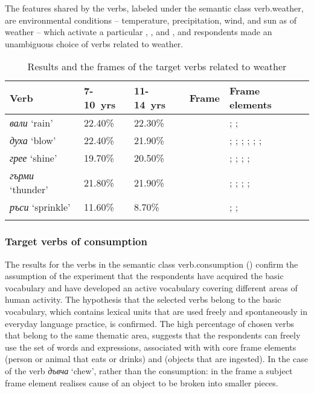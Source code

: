 \documentclass[output=paper,colorlinks,citecolor=brown]{langscibook}
\begin{document}
The features shared by the verbs, labeled under the semantic class verb.wea\-ther, are environmental conditions -- temperature, precipitation, wind, and sun as  of weather --  which activate a particular , , and , and respondents made an unambiguous choice of verbs related to weather. 

\begin{table}
\begin{tabularx}{\textwidth}{QllXQ}
\lsptoprule
Verb & 7-10~yrs & 11-14~yrs & Frame & Frame elements \\
\midrule
\textit{вали} `rain' & 22.40\% & 22.30\% & & ; ;  \\\midrule
\textit{духа} `blow' & 22.40\% & 21.90\% &  & ; ; ; ; ; ;  \\\midrule
\textit{грее} `shine' & 19.70\% & 20.50\% &  & ; ; ; ;  \\\midrule
\textit{гърми} `thunder' & 21.80\% & 21.90\% &  & ; ; ; ;  \\\midrule
\textit{ръси} `sprinkle' & 11.60\% & 8.70\% &  & ; ;  \\ 
\lspbottomrule
\end{tabularx}
\caption{Results and the frames of the target verbs related to weather}
\label{tab:chapterhandle:keytotable3}
\end{table}


\subsubsection{Target verbs of consumption}\label{subsubsect:4.1.3}

The results for the verbs in the semantic class verb.consumption () confirm the assumption of the experiment that the respondents have acquired the basic vocabulary and have developed an active vocabulary covering different areas of human activity. The hypothesis that the selected verbs belong to the basic vocabulary, which contains lexical units that are used freely and spontaneously in everyday language practice, is confirmed. The high percentage of chosen verbs that belong to the same thematic area, suggests that the respondents can freely use the set of words and expressions, associated with   with core frame elements   (person or animal that eats or drinks)  and  (objects that are ingested). In the case of the verb \textit{дъвча} `chew',  rather than the consumption: in the frame  a subject frame element  realises cause  of an object  to be broken into smaller pieces.
\end{document}
